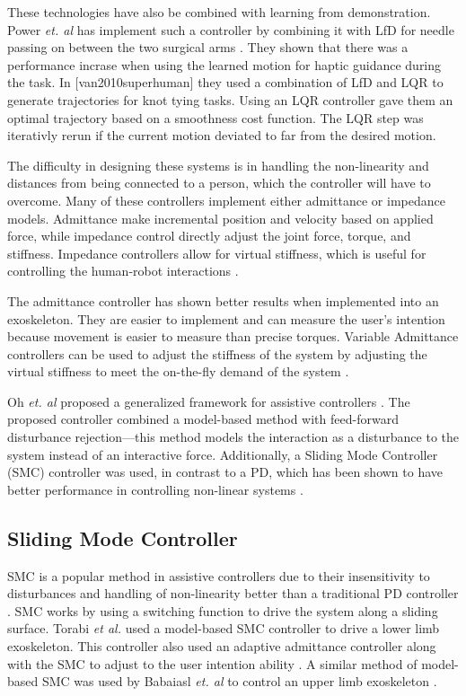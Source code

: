 These technologies have also be combined with learning from demonstration. Power \textit{et. al} has implement such a controller by combining it with LfD for needle passing on between the two surgical arms \cite{power2015cooperative}. They shown that there was a performance incrase when using the learned motion for haptic guidance during the task. In [van2010superhuman] they used a combination of LfD and LQR to generate trajectories for knot tying tasks. Using an LQR controller gave them an optimal trajectory based on a smoothness cost function. The LQR step was iterativly rerun if the current motion deviated to far from the desired motion. 


The difficulty in designing these systems is in handling the non-linearity and distances from being connected to a person, which the controller will have to overcome. Many of these controllers implement either admittance or impedance models. Admittance make incremental position and velocity based on applied force, while impedance control directly adjust the joint force, torque, and stiffness. Impedance controllers allow for virtual stiffness, which is useful for controlling the human-robot interactions \cite{keemink2018admittance}. 

The admittance controller has shown better results when implemented into an exoskeleton. They are easier to implement and can measure the user's intention because movement is easier to measure than precise torques. Variable Admittance controllers can be used to adjust the stiffness of the system by adjusting the virtual stiffness to meet the on-the-fly demand of the system \cite{aguirre2007active,newman1994stable}.

Oh \textit{et. al} proposed a generalized framework for assistive controllers \cite{oh2015generalized}. The proposed controller combined a model-based method with feed-forward disturbance rejection—this method models the interaction as a disturbance to the system instead of an interactive force.  Additionally, a Sliding Mode Controller (SMC) controller was used, in contrast to a PD, which has been shown to have better performance in controlling non-linear systems \cite{slotine1991applied}.


\subsection{Sliding Mode Controller}

SMC is a popular method in assistive controllers due to their insensitivity to disturbances and handling of non-linearity better than a traditional PD controller \cite{nasir2010performance} \cite{sanngoen2020review} \cite{fischer-SMC}. SMC works by using a switching function to drive the system along a sliding surface. Torabi \textit{et al.} used a model-based SMC controller to drive a lower limb exoskeleton. This controller also used an adaptive admittance controller along with the SMC to adjust to the user intention ability \cite{torabi2018robust}. A similar method of model-based SMC was used by Babaiasl \textit{et. al} to control an upper limb exoskeleton \cite{babaiasl2015sliding}.


